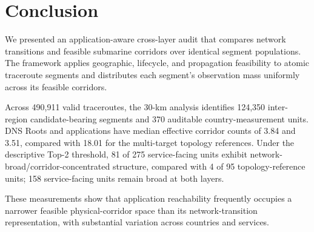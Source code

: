 \section{Conclusion}
\label{sec:conclusion}

We presented an application-aware cross-layer audit that compares network
transitions and feasible submarine corridors over identical segment
populations. The framework applies geographic, lifecycle, and propagation
feasibility to atomic traceroute segments and distributes each segment's
observation mass uniformly across its feasible corridors.

Across 490,911 valid traceroutes, the 30-km analysis identifies 124,350
inter-region candidate-bearing segments and 370 auditable
country-measurement units. DNS Roots and applications have median effective
corridor counts of 3.84 and 3.51, compared with 18.01 for the multi-target
topology references. Under the descriptive Top-2 threshold, 81 of 275
service-facing units exhibit network-broad/corridor-concentrated structure,
compared with 4 of 95 topology-reference units; 158 service-facing units
remain broad at both layers.

These measurements show that application reachability frequently occupies a
narrower feasible physical-corridor space than its network-transition
representation, with substantial variation across countries and services.